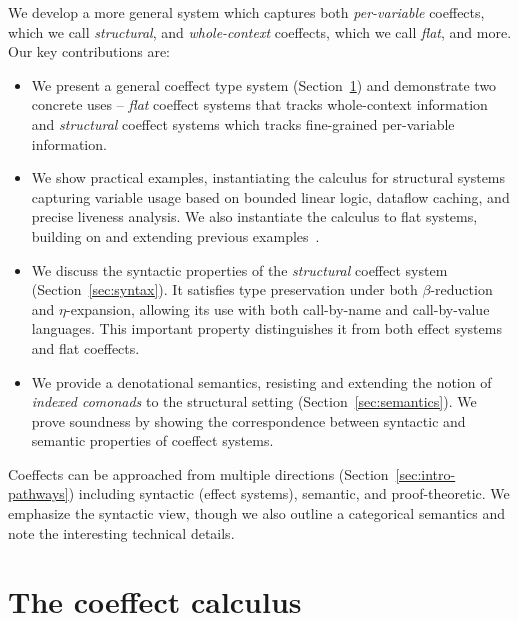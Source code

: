 We develop a more general system which captures both
\emph{per-variable} coeffects, which we call \emph{structural}, and
\emph{whole-context} coeffects, which we call \emph{flat}, and more. Our
key contributions are:

\begin{itemize}
\item We present a general coeffect type system (Section~\ref{sec:coeffects}) and demonstrate two 
  concrete uses -- \emph{flat} coeffect systems that tracks whole-context information and 
  \emph{structural} coeffect systems which tracks fine-grained per-variable information. 

\item We show practical examples, instantiating the calculus for structural systems capturing 
  variable usage based on bounded linear logic, dataflow caching, and precise liveness analysis.
  We also instantiate the calculus to flat systems, building on and extending previous examples~\cite{petricek2013coeffects}.

\item We discuss the syntactic properties of the \emph{structural} coeffect system 
  (Section~\ref{sec:syntax}). It satisfies type preservation under both $\beta$-reduction 
  and $\eta$-expansion, allowing its use with both call-by-name and call-by-value languages.
  This important property distinguishes it from both effect systems and flat coeffects.

\item We provide a denotational semantics, resisting and extending the notion of \emph{indexed comonads} to the 
structural setting (Section~\ref{sec:semantics}). We prove soundness by showing 
  the correspondence between syntactic and semantic properties of coeffect systems.
\end{itemize}

\noindent
Coeffects can be approached from multiple directions (Section~\ref{sec:intro-pathways}) including 
syntactic (effect systems), semantic, and proof-theoretic. We 
emphasize the syntactic view, though we also outline a categorical semantics
and note the interesting technical details. 


\section{The coeffect calculus}
\label{sec:coeffects}

